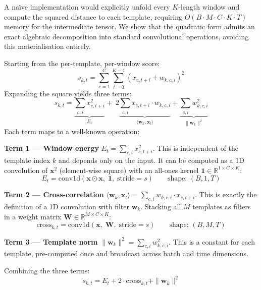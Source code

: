 \documentclass{iopjournal}
\begin{document}
A na\"ive implementation would explicitly unfold every $K$-length window and compute the squared distance to each template, requiring $O(B \cdot M \cdot C \cdot K \cdot T)$ memory for the intermediate tensor. We show that the quadratic form admits an exact algebraic decomposition into standard convolutional operations, avoiding this materialisation entirely.

Starting from the per-template, per-window score:
\begin{equation}
s_{k,t} = \sum_{c=1}^{C} \sum_{i=0}^{K-1} (x_{c,t+i} + w_{k,c,i})^2
\end{equation}
Expanding the square yields three terms:
\begin{equation}
s_{k,t} = \underbrace{\sum_{c,i} x_{c,t+i}^2}_{E_t} + \; 2 \underbrace{\sum_{c,i} x_{c,t+i} \cdot w_{k,c,i}}_{\langle \mathbf{w}_k, \mathbf{x}_t \rangle} + \underbrace{\sum_{c,i} w_{k,c,i}^2}_{\|\mathbf{w}_k\|^2}
\end{equation}
Each term maps to a well-known operation:

\textbf{Term 1 --- Window energy} $E_t = \sum_{c,i} x_{c,t+i}^2$. This is independent of the template index $k$ and depends only on the input. It can be computed as a 1D convolution of $\mathbf{x}^2$ (element-wise square) with an all-ones kernel $\mathbf{1} \in \mathbb{R}^{1 \times C \times K}$:
\begin{equation}
E_t = \mathrm{conv1d}(\mathbf{x} \odot \mathbf{x}, \; \mathbf{1}, \; \mathrm{stride}=s) \qquad \text{shape: } (B, 1, T)
\end{equation}

\textbf{Term 2 --- Cross-correlation} $\langle \mathbf{w}_k, \mathbf{x}_t \rangle = \sum_{c,i} w_{k,c,i} \cdot x_{c,t+i}$. This is exactly the definition of a 1D convolution with filter $\mathbf{w}_k$. Stacking all $M$ templates as filters in a weight matrix $\mathbf{W} \in \mathbb{R}^{M \times C \times K}$:
\begin{equation}
\mathrm{cross}_{k,t} = \mathrm{conv1d}(\mathbf{x}, \; \mathbf{W}, \; \mathrm{stride}=s) \qquad \text{shape: } (B, M, T)
\end{equation}

\textbf{Term 3 --- Template norm} $\|\mathbf{w}_k\|^2 = \sum_{c,i} w_{k,c,i}^2$. This is a constant for each template, pre-computed once and broadcast across batch and time dimensions.

Combining the three terms:
\begin{equation}
s_{k,t} = E_t + 2 \cdot \mathrm{cross}_{k,t} + \|\mathbf{w}_k\|^2
\end{equation}
\end{document}
